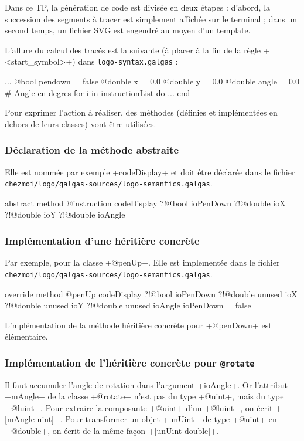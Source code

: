 Dans ce TP, la génération de code est divisée en deux étapes : d'abord, la succession des segments à tracer est simplement affichée sur le terminal ; dans un second temps, un fichier SVG est engendré au moyen d'un template.

L'allure du calcul des tracés est la suivante (à placer à la fin de la règle \ggs+<start_symbol>+) dans \texttt{logo-syntax.galgas} :

\begin{galgas}
  ...
  @bool pendown = false
  @double x = 0.0
  @double y = 0.0
  @double angle = 0.0 # Angle en degres
  for i in instructionList do
    ...
  end
\end{galgas}

Pour exprimer l'action à réaliser, des méthodes (définies et implémentées en dehors de leurs classes) vont être utilisées.

\subsubsection{Déclaration de la méthode abstraite}
Elle est nommée par exemple \ggs+codeDisplay+ et doit être déclarée dans le fichier \texttt{chezmoi/logo/galgas-sources/logo-semantics.galgas}.

\begin{galgas}
abstract method @instruction codeDisplay
  ?!@bool ioPenDown
  ?!@double ioX
  ?!@double ioY
  ?!@double ioAngle
\end{galgas}

\subsubsection{Implémentation d'une héritière concrète}
Par exemple, pour la classe \ggs+@penUp+. Elle est implementée dans le fichier \texttt{chezmoi/logo/galgas-sources\-/logo-semantics.galgas}.

\begin{galgas}
override method @penUp codeDisplay
  ?!@bool ioPenDown
  ?!@double unused ioX
  ?!@double unused ioY
  ?!@double unused ioAngle
{
  ioPenDown = false
}
\end{galgas}

L'mplémentation de la méthode héritière concrète pour \ggs+@penDown+ est élémentaire.

\subsubsection{Implémentation de l'héritière concrète pour \texttt{@rotate}}
Il faut accumuler l'angle de rotation dans l'argument \ggs+ioAngle+. Or l'attribut \ggs+mAngle+ de la classe \ggs+@rotate+ n'est pas du type \ggs+@uint+, mais du type \ggs+@luint+. Pour extraire la composante \ggs+@uint+ d’un \ggs+@luint+, on écrit \ggs+[mAngle uint]+. Pour transformer un objet \ggs+unUint+ de type \ggs+@uint+ en \ggs+@double+, on écrit de la même façon \ggs+[unUint double]+. 


